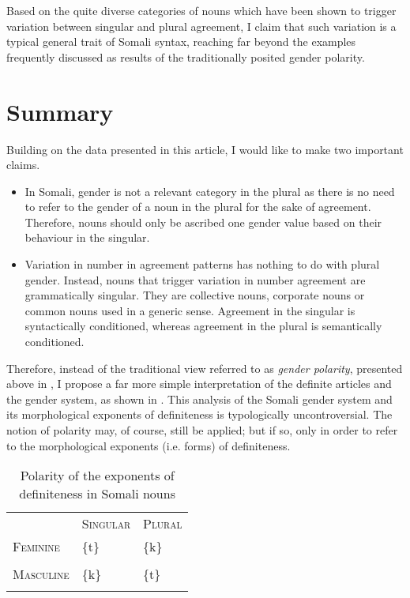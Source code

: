 \documentclass[output=paper]{langsci/langscibook}
\begin{document}
Based on the quite diverse categories of nouns which have been shown to trigger variation between singular and plural agreement, I claim that such variation is a typical general trait of Somali syntax, reaching far beyond the examples frequently discussed as results of the traditionally posited gender polarity.  

\section{Summary}

Building on the data presented in this article, I would like to make two important claims. 


\begin{itemize}
\item In Somali, gender is not a relevant category in the plural as there is no need to refer to the gender of a noun in the plural for the sake of agreement. Therefore, nouns should only be ascribed one gender value based on their behaviour in the singular. 

\item Variation in number in agreement patterns has nothing to do with plural gender. Instead, nouns that trigger variation in number agreement are grammatically singular. They are collective nouns, corporate nouns or common nouns used in a generic sense. Agreement in the singular is syntactically conditioned, whereas agreement in the plural is semantically conditioned.

\end{itemize}

Therefore, instead of the traditional view referred to as \textit{gender polarity}, presented above in , I propose a far more simple interpretation of the definite articles and the gender system, as shown in . This analysis of the Somali gender system and its morphological exponents of definiteness is typologically uncontroversial. The notion of polarity may, of course, still be applied; but if so, only in order to refer to the morphological exponents (i.e. forms) of definiteness.


\begin{table}
\caption{Polarity of the exponents of definiteness in Somali nouns}
\label{tab:15}

\begin{tabularx}{\textwidth}{XXX} & \textsc{Singular}& \textsc{Plural}\par\\
\lsptoprule
 \textsc{Feminine}& \{t\}& \{k\}\par\\
\hhline{--~} &  & \\
\hhline{~~-}
 \textsc{Masculine}& \{k\}& \{t\}\par\\
\lspbottomrule
\end{tabularx}

\end{table} 
\end{document}
